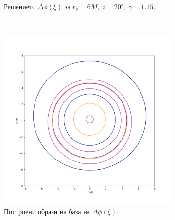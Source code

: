 \begin{figure}[!htb]
\begin{subfigure}{6cm}
		\caption{Решението $\Delta\phi(\xi)$ за $r_s = 6M,\,\, i = 20^\circ,\,\,\gamma = 1.15$.} 
	\end{subfigure}\,\,\,
	\begin{subfigure}{6cm}
		\hspace{-0.8cm}
		\includegraphics[scale = 0.3]{GB_20_deg_r6_gamma_1.15.png}
		\caption{Построени образи на база на  $\Delta\phi(\xi)$.} 
	\end{subfigure}
		\begin{subfigure}{6cm}
		\hspace{0.8cm}

\end{subfigure}
\end{figure}
